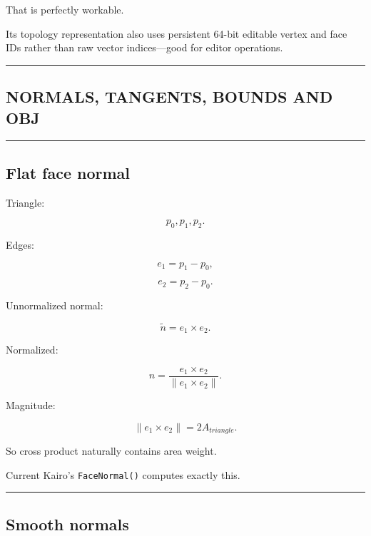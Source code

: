 That is perfectly workable.

Its topology representation also uses persistent 64-bit editable vertex and face IDs rather than raw vector indices---good for editor operations.

\begin{center}\rule{0.5\linewidth}{0.5pt}\end{center}

\subsection{NORMALS, TANGENTS, BOUNDS AND OBJ}\label{04-visual-computing-ii-ch041-normals-tangents-bounds-and-obj}

\hypertarget{04-visual-computing-ii-ch041-normals-tangents-bounds-and-obj}{}

\begin{center}\rule{0.5\linewidth}{0.5pt}\end{center}

\subsection{Flat face normal}\label{04-visual-computing-ii-ch041-flat-face-normal}

\hypertarget{04-visual-computing-ii-ch041-flat-face-normal}{}

Triangle:

\[
p_0,p_1,p_2.
\]

Edges:

\[
e_1=p_1-p_0,
\]

\[
e_2=p_2-p_0.
\]

Unnormalized normal:

\[
\tilde n=
e_1\times e_2.
\]

Normalized:

\[
\boxed{
n=
\frac{
e_1\times e_2
}{
\|e_1\times e_2\|
}.
}
\]

Magnitude:

\[
\|e_1\times e_2\|
=
2A_{triangle}.
\]

So cross product naturally contains area weight.

Current Kairo's \texttt{FaceNormal()} computes exactly this.

\begin{center}\rule{0.5\linewidth}{0.5pt}\end{center}

\subsection{Smooth normals}\label{04-visual-computing-ii-ch041-smooth-normals}

